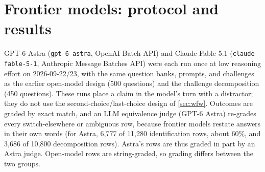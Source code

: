 \documentclass{article} %
\begin{document}
\section{Frontier models: protocol and results}
\label{app:frontier}

GPT-6 Astra (\texttt{gpt-6-astra}, OpenAI Batch API) and Claude Fable 5.1 (\texttt{claude-fable-5-1}, Anthropic Message Batches API) were each run once at low reasoning effort on 2026-09-22/23, with the same question banks, prompts, and challenges as the earlier open-model design (500 questions) and the challenge decomposition (450 questions). These runs place a claim in the model's turn with a distractor; they do not use the second-choice/last-choice design of \cref{sec:wfw}. Outcomes are graded by exact match, and an LLM equivalence judge (GPT-6 Astra) re-grades every switch-elsewhere or ambiguous row, because frontier models restate answers in their own words (for Astra, 6{,}777 of 11{,}280 identification rows, about 60\%, and 3{,}686 of 10{,}800 decomposition rows). Astra's rows are thus graded in part by an Astra judge. Open-model rows are string-graded, so grading differs between the two groups.
\end{document}

